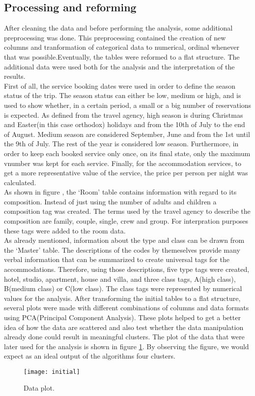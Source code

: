 \subsection{Processing and reforming}
After cleaning the data and before performing the analysis, some additional preprocessing was done. This preprocessing contained the creation of new columns and tranformation of categorical data to numerical, ordinal whenever that was possible.Eventually, the tables were reformed to a flat structure. The additional data were used both for the analysis and the interpretation of the results. \\
First of all, the service booking dates were used in order to define the season status of the trip. The season status can either be low, medium or high, and is used to show whether, in a certain period, a small or a big number of reservations is expected. As defined from the travel agency, high season is during Christmas and Easter(in this case orthodox) holidays and from the 10th of July to the end of August. Medium season are considered September, June and from the 1st until the 9th of July. The rest of the year is considered low season. Furthermore, in order to keep each booked service only once, on its final state, only the maximum vnumber was kept for each service. Finally, for the accommodation services, to get a more representative value of the service, the price per person per night was calculated. \\
As shown in figure , the `Room' table contains information with regard to its composition. Instead of just using the number of adults and children a composition tag was created. The terms used by the travel agency to describe the composition are family, couple, single, crew and group. For interpration purposes these tags were added to the room data. \\
As already mentioned, information about the type and class can be drawn from the `Master' table. The descriptions of the codes by themeselves provide many verbal information that can be summarized to create universal tags for the accommodations. Therefore, using those descriptions, five type tags were created, hotel, studio, apartment, house and villa, and three class tags, A(high class), B(medium class) or C(low class). The class tags were represented by numerical values for the analysis.
After transforming the initial tables to a flat structure, several plots were made with different combinations of columns and data formats using PCA(Principal Component Analysis). These plots helped to get a better idea of how the data are scattered and also test whether the data manipulation already done could result in meaningful clusters. The plot of the data that were later used for the analysis is shown in figure \ref{fig:PCA}. By observing the figure, we would expect as an ideal output of the algorithms four clusters. \\
\begin{figure}[ht]
\centering
\texttt{[image: initial]}
\caption{Data plot.}
\label{fig:PCA}
\end{figure}

